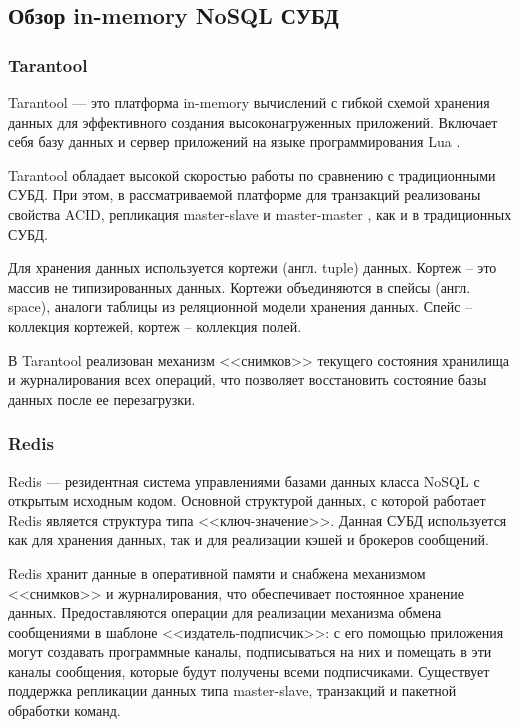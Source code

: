 \subsection{Обзор in-memory NoSQL СУБД}

\subsubsection{Tarantool}

Tarantool \cite{tarantool} --- это платформа in-memory вычислений с гибкой схемой хранения данных для эффективного создания высоконагруженных приложений. Включает себя базу данных и сервер приложений на языке программирования Lua \cite{lua}.

Tarantool обладает высокой скоростью работы по сравнению с традиционными СУБД. При этом, в рассматриваемой платформе для транзакций реализованы свойства ACID, репликация master-slave \cite{master-slave} и master-master \cite{master-master}, как и в традиционных СУБД.

Для хранения данных используется кортежи (англ. tuple) данных. Кортеж -- это массив не типизированных данных. Кортежи объединяются в спейсы (англ. space), аналоги таблицы из реляционной модели хранения данных. Спейс -- коллекция кортежей, кортеж -- коллекция полей.

В Tarantool реализован механизм <<снимков>> текущего состояния хранилища и журналирования всех операций, что позволяет восстановить состояние базы данных после ее перезагрузки.\\

\subsubsection{Redis}
Redis \cite{redis} --- резидентная система управлениями базами данных класса NoSQL с открытым исходным кодом. Основной структурой данных, с которой работает Redis является структура типа <<ключ-значение>>. Данная СУБД используется как для хранения данных, так и для реализации кэшей и брокеров сообщений.

Redis хранит данные в оперативной памяти и снабжена механизмом <<снимков>> и журналирования, что обеспечивает постоянное хранение данных. Предоставляются операции для реализации механизма обмена сообщениями в шаблоне <<издатель-подписчик>>: с его помощью приложения могут создавать программные каналы, подписываться на них и помещать в эти каналы сообщения, которые будут получены всеми подписчиками. Существует поддержка репликации данных типа master-slave, транзакций и пакетной обработки команд.

